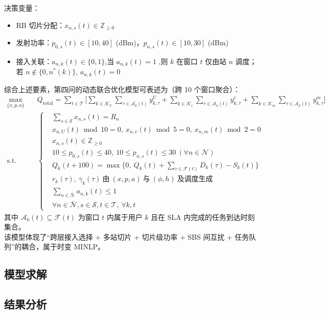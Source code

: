 决策变量：
\begin{itemize}
  \item RB 切片分配：$x_{n,s}(t)\in\mathbb{Z}_{\ge 0}$
  \item 发射功率：$p_{0,s}(t)\in[10,40]$ (dBm)，$p_{n,s}(t)\in[10,30]$ (dBm)
  \item 接入关联：$a_{n,k}(t)\in\{0,1\}$,当 $a_{n,k}(t)=1$ ,则 $k$ 在窗口 $t$ 仅由站 $n$ 调度；若 $n\notin\{0,n^*(k)\}$, $a_{n,k}(t)=0$
\end{itemize}
综合上述要素，第四问的动态联合优化模型可表述为（跨 10 个窗口聚合）：
\begin{equation}
\begin{aligned}
\max\limits_{\{x,p,a\}}\quad & Q_{\text{total}}=\sum_{t\in\mathcal{T}}\Bigg[\sum_{k\in\mathcal{K}_U}\sum_{\tau\in\mathcal{A}_k(t)} y^{U}_{k,\tau}+\sum_{k\in\mathcal{K}_e}\sum_{\tau\in\mathcal{A}_k(t)} y^{e}_{k,\tau}+\sum_{k\in\mathcal{K}_m}\sum_{\tau\in\mathcal{A}_k(t)} y^{m}_{k,\tau}\Bigg] \\
\text{s.t.}\quad &
\left\{
\begin{aligned}
& \sum_{s\in\mathcal{S}} x_{n,s}(t)=R_n\\
& x_{n,U}(t)\bmod 10=0,\ x_{n,e}(t)\bmod 5=0,\ x_{n,m}(t)\bmod 2=0\\
& x_{n,s}(t)\in\mathbb{Z}_{\ge 0}\\
& 10\le p_{0,s}(t)\le 40,\ 10\le p_{n,s}(t)\le 30\ (\forall n\in\mathcal{N})\\
& Q_k(t+100)=\max\Big\{0,\ Q_k(t)+\sum_{\tau\in\mathcal{F}(t)} D_k(\tau)-S_k(t)\Big\}\\
& r_k(\tau),\ \gamma_k(\tau)\ \text{由}\ (x,p,a)\ \text{与}\ (\phi,h)\ \text{及调度生成}\\
& \sum_{n\in\bar{\mathcal{N}}} a_{n,k}(t)\le 1\\
& \forall n\in\bar{\mathcal{N}},s\in\mathcal{S},t\in\mathcal{T},\ \forall k,t
\end{aligned}
\right.
\end{aligned}
\end{equation}
其中 $\mathcal{A}_k(t)\subseteq\mathcal{F}(t)$ 为窗口 $t$ 内属于用户 $k$ 且在 SLA 内完成的任务到达时刻集合。\\
该模型体现了“跨层接入选择 + 多站切片 + 切片级功率 + SBS 间互扰 + 任务队列”的耦合，属于时变 MINLP。

\subsection{模型求解}


\subsection{结果分析}
